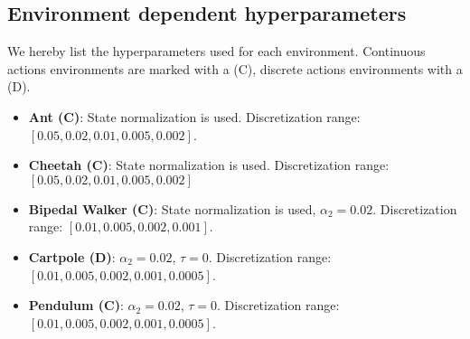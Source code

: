 \subsection{Environment dependent hyperparameters}
We hereby list the hyperparameters used for each environment. Continuous actions environments are marked with a
(C), discrete actions environments with a (D).
\begin{itemize}
	\item {\bf Ant (C)}: State normalization is used. Discretization range: $[0.05, 0.02, 0.01, 0.005, 0.002]$.
	\item {\bf Cheetah (C)}: State normalization is used. Discretization range: $[0.05, 0.02, 0.01, 0.005, 0.002]$
	\item {\bf Bipedal Walker (C)}: State normalization is used, $\alpha_2 = 0.02$. Discretization range: $[0.01, 0.005, 0.002, 0.001]$.
	\item {\bf Cartpole (D)}: $\alpha_2 = 0.02$, $\tau = 0$. Discretization range: $[0.01, 0.005, 0.002, 0.001, 0.0005]$.
	\item {\bf Pendulum (C)}: $\alpha_2 = 0.02$, $\tau = 0$. Discretization range: $[0.01, 0.005, 0.002, 0.001, 0.0005]$.

\end{itemize}
